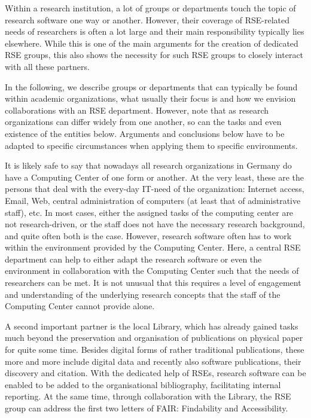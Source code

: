 \documentclass[a4paper]{article}
\begin{document}
Within a research institution, a lot of groups or departments touch the topic of research software one way or another.
However, their coverage of RSE-related needs of researchers is often a lot large and their main responsibility typically lies elsewhere.
While this is one of the main arguments for the creation of dedicated RSE groups, this also shows the necessity for such RSE groups to closely interact with all these partners.

In the following, we describe groups or departments that can typically be found within academic organizations,
what usually their focus is and how we envision collaborations with an RSE department.
However, note that as research organizations can differ widely from one another, so can the tasks and even existence of the entities below.
Arguments and conclusions below have to be adapted to specific circumstances when applying them to specific environments.

It is likely safe to say that nowadays all research organizations in Germany do have a Computing Center of one form or another.
At the very least, these are the persons that deal with the every-day IT-need of the organization:
Internet access, Email, Web, central administration of computers (at least that of administrative staff), etc.
In most cases, either the assigned tasks of the computing center are not research-driven, or the staff does not have the necessary research background, and quite often both is the case.
However, research software often has to work within the environment provided by the Computing Center.
Here, a central RSE department can help to either adapt the research software or even the environment in collaboration with the Computing Center such that the needs of researchers can be met.
It is not unusual that this requires a level of engagement and understanding of the underlying research concepts that the staff of the Computing Center cannot provide alone.

A second important partner is the local Library, which has already gained tasks much beyond the preservation and organisation of publications on physical paper for quite some time.
Besides digital forms of rather traditional publications, these more and more include digital data and recently also software publications, their discovery and citation.
With the dedicated help of RSEs, research software can be enabled to be added to the organisational bibliography, facilitating internal reporting.
At the same time, through collaboration with the Library, the RSE group can address the first two letters of FAIR: Findability and Accessibility.
\end{document}

